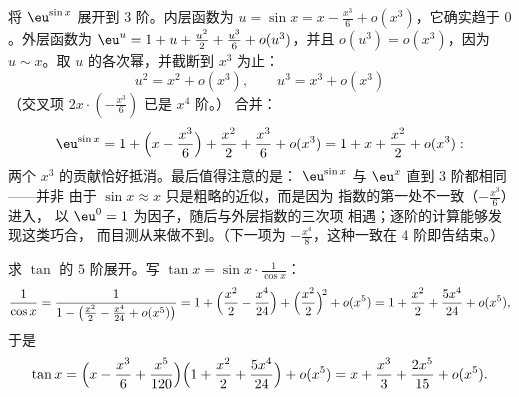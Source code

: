 \begin{example}[复合，并列出逐阶计算]\label{ex:b1:taylor:esin}
将 $\eu^{\sin x}$ 展开到 $3$ 阶。内层函数为 $u = \sin x
= x - \frac{x^3}{6} + o(x^3)$，它确实趋于 $0$。外层函数为
$\eu^u = 1 + u + \frac{u^2}{2} + \frac{u^3}{6} + o(u^3)$，并且
$o(u^3) = o(x^3)$，因为 $u \sim x$。取 $u$ 的各次幂，并截断到
$x^3$ 为止：
\[
u^2 = x^2 + o(x^3), \qquad u^3 = x^3 + o(x^3)
\]
（交叉项 $2x\cdot(-\frac{x^3}{6})$ 已是 $x^4$ 阶。）
合并：
\[
\eu^{\sin x} = 1 + \Bigl(x - \frac{x^3}{6}\Bigr) + \frac{x^2}{2}
+ \frac{x^3}{6} + o(x^3)
= 1 + x + \frac{x^2}{2} + o(x^3) :
\]
两个 $x^3$ 的贡献恰好抵消。最后值得注意的是：
$\eu^{\sin x}$ 与 $\eu^x$ 直到 $3$ 阶都相同——并非
由于 $\sin x \approx x$ 只是粗略的近似，而是因为
指数的第一处不一致（$-\frac{x^3}{6}$）进入，
以 $\eu^0 = 1$ 为因子，随后与外层指数的三次项
相遇；逐阶的计算能够发现这类巧合，
而目测从来做不到。（下一项为
$-\frac{x^4}{8}$，这种一致在 $4$ 阶即告结束。）
\end{example}

\begin{example}\label{ex:b1:taylor:tan}
求 $\tan$ 的 $5$ 阶展开。写 $\tan x =
\sin x \cdot \frac{1}{\cos x}$：
\[
\frac{1}{\cos x} = \frac{1}{1 - \bigl(\frac{x^2}{2} - \frac{x^4}{24}
+ o(x^5)\bigr)}
= 1 + \Bigl(\frac{x^2}{2} - \frac{x^4}{24}\Bigr)
+ \Bigl(\frac{x^2}{2}\Bigr)^{\!2} + o(x^5)
= 1 + \frac{x^2}{2} + \frac{5x^4}{24} + o(x^5),
\]
于是
\[
\tan x = \Bigl(x - \frac{x^3}{6} + \frac{x^5}{120}\Bigr)
\Bigl(1 + \frac{x^2}{2} + \frac{5x^4}{24}\Bigr) + o(x^5)
= x + \frac{x^3}{3} + \frac{2x^5}{15} + o(x^5) .
\]
\end{example}


